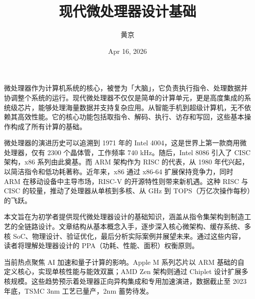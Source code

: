 \title{现代微处理器设计基础}
\author{黄京}
\date{Apr 16, 2026}
\maketitle
微处理器作为计算机系统的核心，被誉为「大脑」，它负责执行指令、处理数据并协调整个系统的运行。现代微处理器不仅仅是简单的计算单元，更是高度集成的系统级芯片，能够处理海量数据并支持复杂应用。从智能手机到超级计算机，无不依赖其高效性能。它的核心功能包括取指令、解码、执行、访存和写回，这些基本操作构成了所有计算的基础。\par
微处理器的演进历史可以追溯到 1971 年的 Intel 4004，这是世界上第一款商用微处理器，仅有 2300 个晶体管，工作频率 740 kHz。随后，Intel 8086 引入了 CISC 架构，x86 系列由此奠基。而 ARM 架构作为 RISC 的代表，从 1980 年代兴起，以简洁指令和低功耗著称。近年来，x86 通过 x86-64 扩展保持竞争力，同时 ARM 在移动设备中主导市场，RISC-V 的开源特性则带来新机遇。这种 RISC 与 CISC 的较量，推动了处理器从单核到多核、从 GHz 到 TOPS（万亿次操作每秒）的飞跃。\par
本文旨在为初学者提供现代微处理器设计的基础知识，涵盖从指令集架构到制造工艺的全链路设计。文章结构从基本概念入手，逐步深入核心微架构、缓存系统、多核 SoC、物理设计、验证优化，最后分析实际案例并展望未来。通过这些内容，读者将理解处理器设计的 PPA（功耗、性能、面积）权衡原则。\par
当前热点聚焦 AI 加速和量子计算的影响。Apple M 系列芯片以 ARM 基础的自定义核心，实现单核性能与能效双赢；AMD Zen 架构则通过 Chiplet 设计扩展多核规模。这些趋势预示着处理器正向异构集成和专用加速演进，数据截止至 2023 年底，TSMC 3nm 工艺已量产，2nm 蓄势待发。\par
